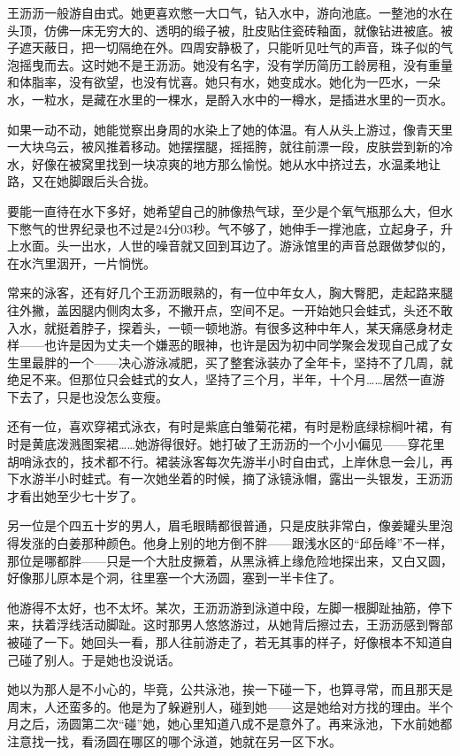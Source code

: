 \documentclass[lang=cn,newtx,12pt,scheme=chinese]{elegantbook}
\begin{document}
王沥沥一般游自由式。她更喜欢憋一大口气，钻入水中，游向池底。一整池的水在头顶，仿佛一床无穷大的、透明的缎子被，肚皮贴住瓷砖釉面，就像钻进被底。被子遮天蔽日，把一切隔绝在外。四周安静极了，只能听见吐气的声音，珠子似的气泡摇曳而去。这时她不是王沥沥。她没有名字，没有学历简历工龄房租，没有重量和体脂率，没有欲望，也没有忧喜。她只有水，她变成水。她化为一匹水，一朵水，一粒水，是藏在水里的一棵水，是酹入水中的一樽水，是插进水里的一页水。

如果一动不动，她能觉察出身周的水染上了她的体温。有人从头上游过，像青天里一大块乌云，被风推着移动。她摆摆腿，摇摇胯，就往前漂一段，皮肤尝到新的冷水，好像在被窝里找到一块凉爽的地方那么愉悦。她从水中挤过去，水温柔地让路，又在她脚跟后头合拢。

要能一直待在水下多好，她希望自己的肺像热气球，至少是个氧气瓶那么大，但水下憋气的世界纪录也不过是24分03秒。气不够了，她伸手一撑池底，立起身子，升上水面。头一出水，人世的噪音就又回到耳边了。游泳馆里的声音总跟做梦似的，在水汽里洇开，一片惝恍。

常来的泳客，还有好几个王沥沥眼熟的，有一位中年女人，胸大臀肥，走起路来腿往外撇，盖因腿内侧肉太多，不撇开点，空间不足。一开始她只会蛙式，头还不敢入水，就挺着脖子，探着头，一顿一顿地游。有很多这种中年人，某天痛感身材走样——也许是因为丈夫一个嫌恶的眼神，也许是因为初中同学聚会发现自己成了女生里最胖的一个——决心游泳减肥，买了整套泳装办了全年卡，坚持不了几周，就绝足不来。但那位只会蛙式的女人，坚持了三个月，半年，十个月……居然一直游下去了，只是也没怎么变瘦。

还有一位，喜欢穿裙式泳衣，有时是紫底白雏菊花裙，有时是粉底绿棕榈叶裙，有时是黄底泼溅图案裙……她游得很好。她打破了王沥沥的一个小小偏见——穿花里胡哨泳衣的，技术都不行。裙装泳客每次先游半小时自由式，上岸休息一会儿，再下水游半小时蛙式。有一次她坐着的时候，摘了泳镜泳帽，露出一头银发，王沥沥才看出她至少七十岁了。

另一位是个四五十岁的男人，眉毛眼睛都很普通，只是皮肤非常白，像姜罐头里泡得发涨的白姜那种颜色。他身上别的地方倒不胖——跟浅水区的“邱岳峰”不一样，那位是哪都胖——只是一个大肚皮撅着，从黑泳裤上缘危险地探出来，又白又圆，好像那儿原本是个洞，往里塞一个大汤圆，塞到一半卡住了。

他游得不太好，也不太坏。某次，王沥沥游到泳道中段，左脚一根脚趾抽筋，停下来，扶着浮线活动脚趾。这时那男人悠悠游过，从她背后擦过去，王沥沥感到臀部被碰了一下。她回头一看，那人往前游走了，若无其事的样子，好像根本不知道自己碰了别人。于是她也没说话。

她以为那人是不小心的，毕竟，公共泳池，挨一下碰一下，也算寻常，而且那天是周末，人还蛮多的。他是为了躲避别人，碰到她——这是她给对方找的理由。半个月之后，汤圆第二次“碰”她，她心里知道八成不是意外了。再来泳池，下水前她都注意找一找，看汤圆在哪区的哪个泳道，她就在另一区下水。
\end{document}

